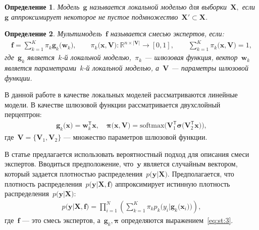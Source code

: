 \documentclass[12pt, twoside]{article}
\newtheorem{definition}{Определение}[section]
\numberwithin{equation}{section}
\begin{document}
\begin{definition}
\label{def:1}
Модель~$\mathbf{g}$ называется локальной моделью для выборки~$\textbf{X},$ если~$\mathbf{g}$ аппроксимирует некоторое не пустое подмножество~$\textbf{X}'\subset\textbf{X}$.
\end{definition}

\begin{definition}
\label{def:2}
Мультимодель~$\mathbf{f}$ называется смесью экспертов, если:
\[
\label{eq:st:2}
\begin{aligned}
\mathbf{f} = \sum_{k=1}^{K}\pi_{k}\mathbf{g}_k\bigr(\mathbf{w}_k\bigr), \qquad \pi_{k}\bigr(\mathbf{x}, \mathbf{V}\bigr):\mathbb{R}^{n\times \left|\mathbf{V}\right|} \to [0, 1], \qquad \sum_{k=1}^{K}\pi_{k}\bigr(\mathbf{x}, \mathbf{V}\bigr) = 1,
\end{aligned}
\]
где~$\mathbf{g}_k$ является~$k$-й локальной моделью,~$\pi_k$ --- шлюзовая функция, вектор~$\mathbf{w}_k$ является параметрами~$k$-й локальной моделью, а~$\mathbf{V}$ --- параметры шлюзовой функции.
\end{definition}

В данной работе в качестве локальных моделей рассматриваются линейные модели. В качестве шлюзовой функции рассматривается двухслойный перцептрон:
\[
\label{eq:st:3}
\begin{aligned}
\mathbf{g}_k\bigr(\textbf{x}\bigr) = \textbf{w}_k^{\mathsf{T}}\textbf{x}, \quad
\bm{\pi}\bigr(\mathbf{x}, \mathbf{V}\bigr) = \text{softmax}\bigr(\mathbf{V}_{1}^{\mathsf{T}}\bm{\sigma}\bigr(\mathbf{V}_2^{\mathsf{T}}\mathbf{x}\bigr)\bigr),
\end{aligned}
\]
где~$\mathbf{V} = \bigr\{\mathbf{V}_1, \mathbf{V}_2\bigr\}$ --- множество параметров шлюзовой функции.

В статье предлагается использовать вероятностный подход для описания смеси экспертов. Вводиться предположение, что~$\textbf{y}$ является случайным вектором, который задается плотностью распределения~$p\bigr(\textbf{y}|\textbf{X}\bigr)$. Предполагается, что плотность распределения~$p\bigr(\textbf{y}|\textbf{X}, \textbf{f}\bigr)$ аппроксимирует истинную плотность распределения~$p\bigr(\textbf{y}|\textbf{X}\bigr)$:
\[
\label{eq:st:new:1}
\begin{aligned}
p\bigr(\textbf{y}|\textbf{X}, \textbf{f}\bigr) = \prod_{i=1}^{N}\left(\sum_{k=1}^{K}\pi_kp_{k}\bigr(y_{i}|\textbf{g}_{k}\bigr(\mathbf{x}_{i}\bigr)\bigr)\right),
\end{aligned}
\]
где~$\textbf{f}$ --- это смесь экспертов, а~$\textbf{g}_k, \bm{\pi}$ определяются выражением~\eqref{eq:st:3}.
\end{document}
